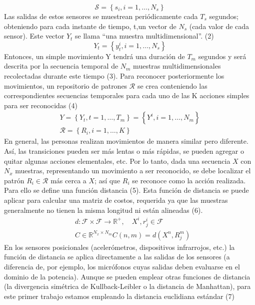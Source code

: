\documentclass[10pt]{article}
\begin{document}
$$
\mathcal{S}=\left\{s_{i}, i=1, \ldots, N_{s}\right\}
$$
Las salidas de estos sensores se muestrean periódicamente cada    $T_{s}$ segundos; obteniendo para cada instante de tiempo, t,un vector de $N_{s}$ (cada valor de cada sensor). Este vector $Y_{t}$ se llama “una muestra multidimensional”. (2) 
$$
Y_{t}=\left\{y_{t}^{i}, i=1, \ldots, N_{s}\right\}
$$
Entonces, un simple movimiento Y tendrá una duración de $T_{m}$ segundos y será descrita por la secuencia temporal de $N_{m}$ muestras multidimensionales recolectadas durante este tiempo (3). Para reconocer posteriormente los movimientos, un repositorio de patrones $\mathcal{R}$ se crea conteniendo las correspondientes secuencias temporales para cada uno de las K acciones simples para ser reconocidas (4)
$$
\begin{gathered}
Y=\left\{Y_{t}, t=1, \ldots, T_{m}\right\}=\left\{Y^{i}, i=1, \ldots, N_{m}\right\} \\
\mathcal{R}=\left\{R_{i}, i=1, \ldots, K\right\}
\end{gathered}
$$
En general, las personas realizan movimientos de manera similar pero diferente. Así, las transiciones pueden ser más lentas o más rápidas, se pueden agregar o quitar algunas acciones elementales, etc.  Por lo tanto, dada una secuencia $X$ con $N_{x}$ muestras, representando un movimiento a ser reconocido, se debe localizar el patrón $R_{i} \in \mathcal{R}$ más cerca a $X$; así que $R_{i}$ se reconoce como la acción realizada. Para ello se define una función distancia (5). Esta función de distancia se puede aplicar para calcular una matriz de costos, requerida ya que las muestras generalmente no tienen la misma longitud ni están alineadas (6).
$$
\begin{aligned}
&d: \mathcal{F} \times \mathcal{F} \rightarrow \mathbb{R}^{+}, \quad X^{i}, r_{j}^{i} \in \mathcal{F} \\
&C \in \mathbb{R}^{N_{x} \times N_{m}} C(n, m)=d\left(X^{n}, R_{j}^{m}\right)
\end{aligned}
$$
En los sensores posicionales (acelerómetros, dispositivos infrarrojos, etc.) la función de distancia se aplica directamente a las salidas de los sensores (a diferencia de, por ejemplo, los micrófonos cuyas salidas deben evaluarse en el dominio de la potencia). Aunque se pueden emplear otras funciones de distancia (la divergencia simétrica de Kullback-Leibler o la distancia de Manhattan), para este primer trabajo estamos empleando la distancia euclidiana estándar (7)
\end{document}
